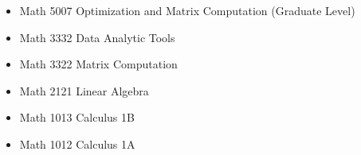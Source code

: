 \begin{itemize}
    \item Math 5007 Optimization and Matrix  Computation (Graduate Level)
    \item Math 3332 Data Analytic Tools
    \item Math 3322 Matrix Computation
    \item Math 2121 Linear Algebra
    \item Math 1013 Calculus 1B
    \item Math 1012 Calculus 1A
\end{itemize}

